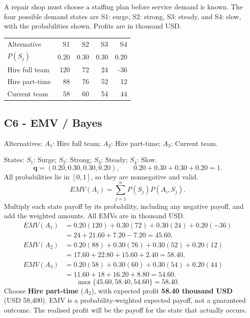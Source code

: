 \clearpage
{}
A repair shop must choose a staffing plan before service demand is known. The four possible demand states are S1: surge, S2: strong, S3: steady, and S4: slow, with the probabilities shown. Profits are in thousand USD.
\begin{center}\small\setlength{\tabcolsep}{4pt}
\begin{tabular}{@{}lrrrr@{}}\toprule
Alternative&S1&S2&S3&S4\\
$P(S_j)$&0.20&0.30&0.30&0.20\\\midrule
Hire full team&120&72&24&-36\\
Hire part-time&88&76&52&12\\
Current team&58&60&54&44\\\bottomrule
\end{tabular}\end{center}
\subsection*{C6 - EMV / Bayes }
\label{sol:repair-shop-staffing-c6}
Alternatives: $A_1$: Hire full team; $A_2$: Hire part-time; $A_3$: Current team.\par
States: $S_1$: Surge; $S_2$: Strong; $S_3$: Steady; $S_4$: Slow.
\[\boldsymbol{q}=(0.20,0.30,0.30,0.20),\qquad 0.20+0.30+0.30+0.20=1.\]
All probabilities lie in $[0,1]$, so they are nonnegative and valid.
\[EMV(A_i)=\sum_{j=1}^{n}P(S_j)P(A_i,S_j).\]
Multiply each state payoff by its probability, including any negative payoff, and add the weighted amounts. All EMVs are in thousand USD.
\begin{align*}
EMV(A_1)&=0.20(120)+0.30(72)+0.30(24)+0.20(-36)\\&=24+21.60+7.20-7.20=45.60,\\
EMV(A_2)&=0.20(88)+0.30(76)+0.30(52)+0.20(12)\\&=17.60+22.80+15.60+2.40=58.40,\\
EMV(A_3)&=0.20(58)+0.30(60)+0.30(54)+0.20(44)\\&=11.60+18+16.20+8.80=54.60.
\end{align*}
\[\max\{45.60,58.40,54.60\}=58.40.\]
Choose \textbf{Hire part-time} ($A_2$), with expected profit \textbf{58.40 thousand USD} (USD 58,400). EMV is a probability-weighted expected payoff, not a guaranteed outcome. The realised profit will be the payoff for the state that actually occurs.

